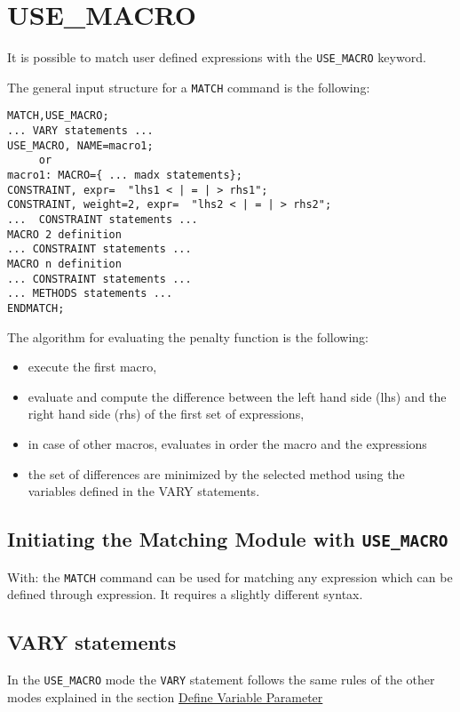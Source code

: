 %

\section{USE\_MACRO}
\label{sec:use-macro}
 
It is possible to match user defined expressions with the
\texttt{USE\_MACRO} keyword. 

The general input structure for a \texttt{MATCH} command is the following:

\begin{verbatim}
MATCH,USE_MACRO;
... VARY statements ...
USE_MACRO, NAME=macro1;
     or
macro1: MACRO={ ... madx statements};
CONSTRAINT, expr=  "lhs1 < | = | > rhs1";
CONSTRAINT, weight=2, expr=  "lhs2 < | = | > rhs2";
...  CONSTRAINT statements ...
MACRO 2 definition
... CONSTRAINT statements ...
MACRO n definition
... CONSTRAINT statements ...
... METHODS statements ...
ENDMATCH;
\end{verbatim}
 
The algorithm for evaluating the penalty function is the following:
 
\begin{itemize}
   \item  execute the first macro,
   \item  evaluate and compute the difference between the left hand side
     (lhs) and the right hand side (rhs) of the first set of expressions, 
   \item in case of other macros, evaluates in order the macro and the
     expressions 
   \item  the set of differences are  minimized by the selected method
     using the variables defined in the VARY statements. 
\end{itemize}

\subsection{Initiating the Matching Module with \texttt{USE\_MACRO}}
 
With:
the \texttt{MATCH} command can be used for matching any expression which
can be defined through expression. It requires a slightly different syntax.

\subsection{VARY statements}
In the \texttt{USE\_MACRO} mode the \texttt{VARY} statement follows the
same rules of the other modes explained in the section
\hyperref[sec:vary]{Define Variable Parameter} 

